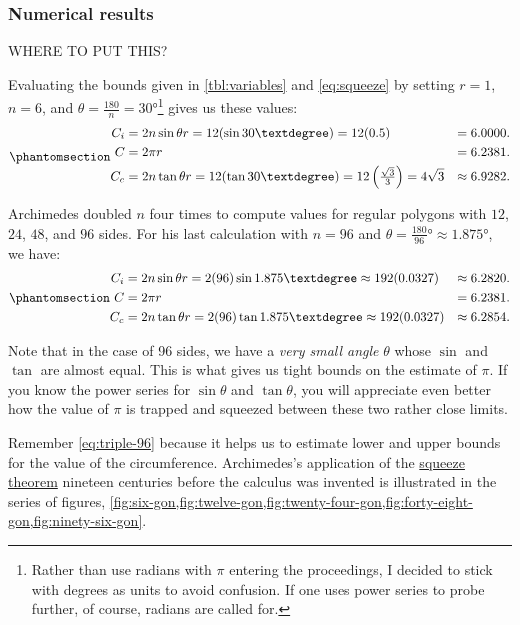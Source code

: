 \documentclass[
  a4paper,
]{article}
\begin{document}
\subsubsection{Numerical results}\label{numerical-results}

WHERE TO PUT THIS?

Evaluating the bounds given in \cref{tbl:variables} and
\cref{eq:squeeze} by setting \(r = 1\), \(n = 6\), and
\(\theta = \frac{180}{n} = 30°\)\footnote{Rather than use radians with
  \(\pi\) entering the proceedings, I decided to stick with degrees as
  units to avoid confusion. If one uses power series to probe further,
  of course, radians are called for.} gives us these values:
\begin{equation}\phantomsection\label{eq:triple-6}{
\begin{aligned}
C_i &= 2n\sin\theta r = 12(\sin 30°) = 12(0.5) &= 6.0000.\\
C &= 2\pi r &= 6.2381.\\
C_c &= 2n\tan\theta r = 12(\tan 30°) = 12\left(\tfrac{\sqrt{3}}{3}\right) = 4\sqrt{3} &\approx 6.9282.\\
\end{aligned}
}\end{equation}

Archimedes doubled \(n\) four times to compute values for regular
polygons with \(12\), \(24\), \(48\), and \(96\) sides. For his last
calculation with \(n = 96\) and
\(\theta = \tfrac{180}{96}° \approx 1.875°\), we have:
\begin{equation}\phantomsection\label{eq:triple-96}{
\begin{aligned}
C_i &= 2n\sin\theta r = 2(96)\sin{1.875°} \approx 192(0.0327) &\approx 6.2820.\\
C &= 2\pi r &= 6.2381.\\
C_c &= 2n\tan\theta r = 2(96)\tan{1.875°} \approx 192(0.0327) &\approx 6.2854.\\
\end{aligned}
}\end{equation}

Note that in the case of 96 sides, we have a \emph{very small angle}
\(\theta\) whose \(\sin\) and \(\tan\) are almost equal. This is what
gives us tight bounds on the estimate of \(\pi\). If you know the power
series for \(\sin\theta\) and \(\tan\theta\), you will appreciate even
better how the value of \(\pi\) is trapped and squeezed between these
two rather close limits.

Remember \cref{eq:triple-96} because it helps us to estimate lower and
upper bounds for the value of the circumference. Archimedes's
application of the
\href{https://en.wikipedia.org/wiki/Squeeze_theorem}{squeeze theorem}
nineteen centuries before the calculus was invented is illustrated in
the series of figures,
\cref{fig:six-gon,fig:twelve-gon,fig:twenty-four-gon,fig:forty-eight-gon,fig:ninety-six-gon}.
\end{document}
